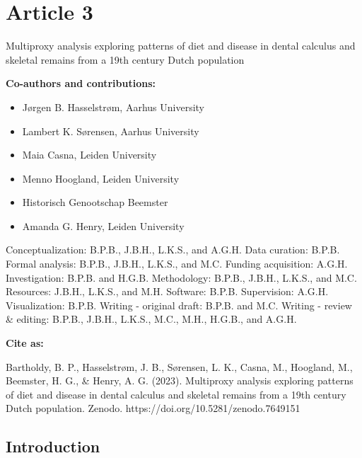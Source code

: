 \documentclass[
  b5paper,
]{book}
\providecommand{\tightlist}{%
  \setlength{\itemsep}{0pt}\setlength{\parskip}{0pt}}
\begin{document}

\hypertarget{article-3}{%
\chapter{Article 3}\label{article-3}}

Multiproxy analysis exploring patterns of diet and disease in dental
calculus and skeletal remains from a 19th century Dutch population

\hfill\break

\footnotesize

\textbf{Co-authors and contributions:}

\begin{itemize}
\tightlist
\item
  Jørgen B. Hasselstrøm, Aarhus University
\item
  Lambert K. Sørensen, Aarhus University
\item
  Maia Casna, Leiden University
\item
  Menno Hoogland, Leiden University
\item
  Historisch Genootschap Beemster
\item
  Amanda G. Henry, Leiden University
\end{itemize}

Conceptualization: B.P.B., J.B.H., L.K.S., and A.G.H. Data curation:
B.P.B. Formal analysis: B.P.B., J.B.H., L.K.S., and M.C. Funding
acquisition: A.G.H. Investigation: B.P.B. and H.G.B. Methodology:
B.P.B., J.B.H., L.K.S., and M.C. Resources: J.B.H., L.K.S., and M.H.
Software: B.P.B. Supervision: A.G.H. Visualization: B.P.B. Writing -
original draft: B.P.B. and M.C. Writing - review \& editing: B.P.B.,
J.B.H., L.K.S., M.C., M.H., H.G.B., and A.G.H.

\textbf{Cite as:}

Bartholdy, B. P., Hasselstrøm, J. B., Sørensen, L. K., Casna, M.,
Hoogland, M., Beemster, H. G., \& Henry, A. G. (2023). Multiproxy
analysis exploring patterns of diet and disease in dental calculus and
skeletal remains from a 19th century Dutch population. Zenodo.
https://doi.org/10.5281/zenodo.7649151

\normalsize

\newpage{}

\hypertarget{mb11CalculusPilot}{%
\section{Introduction}\label{mb11CalculusPilot}}
\end{document}
